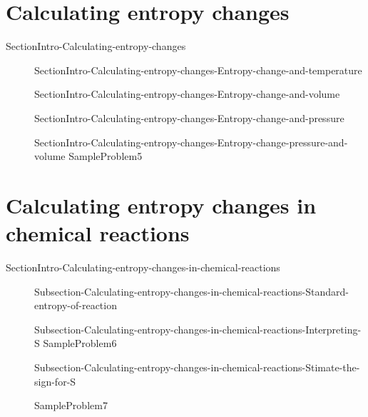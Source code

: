 \documentclass[main.tex]{subfiles}
\newcommand\chapterlabel{Ch-thermo}\setcounter{figurenewcounter}{0}\setcounter{tablenewcounter}{0}\setcounter{formulanewcounter}{0}
\begin{document}
 \section{Calculating entropy changes }
{SectionIntro-Calculating-entropy-changes}
\sloppy\begin{description}
 \item[]{SectionIntro-Calculating-entropy-changes-Entropy-change-and-temperature}
 \item[]{SectionIntro-Calculating-entropy-changes-Entropy-change-and-volume}
    \item[]{SectionIntro-Calculating-entropy-changes-Entropy-change-and-pressure} 
   \item[]{SectionIntro-Calculating-entropy-changes-Entropy-change-pressure-and-volume}
    {SampleProblem5}
   
 \end{description}
 
 
 
 \section{Calculating entropy changes in chemical reactions}{SectionIntro-Calculating-entropy-changes-in-chemical-reactions}
\sloppy\begin{description}
\item[]{Subsection-Calculating-entropy-changes-in-chemical-reactions-Standard-entropy-of-reaction}
\item[]{Subsection-Calculating-entropy-changes-in-chemical-reactions-Interpreting-S}
{SampleProblem6}
\item[]{Subsection-Calculating-entropy-changes-in-chemical-reactions-Stimate-the-sign-for-S}


{SampleProblem7}
\end{description}
\end{document}
